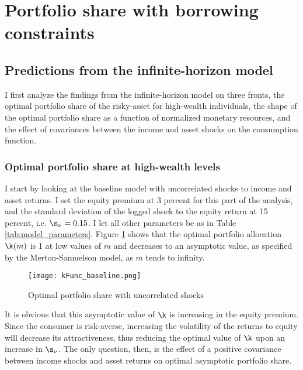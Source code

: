 \section{Portfolio share with borrowing constraints}\label{results}

\subsection{Predictions from the infinite-horizon model}

I first analyze the findings from the infinite-horizon model on three fronts, the optimal portfolio share of the risky-asset for high-wealth individuals, the shape of the optimal portfolio share as a function of normalized monetary resources, and the effect of covariances between the income and asset shocks on the consumption function.

\subsubsection{Optimal portfolio share at high-wealth levels}

I start by looking at the baseline model with uncorrelated shocks to income and asset returns. I set the equity premium at 3 percent for this part of the analysis, and the standard deviation of the logged shock to the equity return at 15 percent, i.e. $\s_{\nu} = 0.15$. I let all other parameters be as in Table \ref{tab:model_parameters}. Figure \ref{fig:baseline_portfolio} shows that the optimal portfolio allocation $\k(m)$ is 1 at low values of $m$ and decreases to an asymptotic value, as specified by the Merton-Samuelson model, as $m$ tends to infinity.

\begin{figure}[h]
    \centering
    \texttt{[image: kFunc\_baseline.png]}
    \caption{Optimal portfolio share with uncorrelated shocks}
    \label{fig:baseline_portfolio}
\end{figure}

It is obvious that this asymptotic value of $\k$ is increasing in the equity premium. Since the consumer is risk-averse, increasing the volatility of the returns to equity will decrease its attractiveness, thus reducing the optimal value of $\k$ upon an increase in $\s_{\nu}$. The only question, then, is the effect of a positive covariance between income shocks and asset returns on optimal asymptotic portfolio share.


